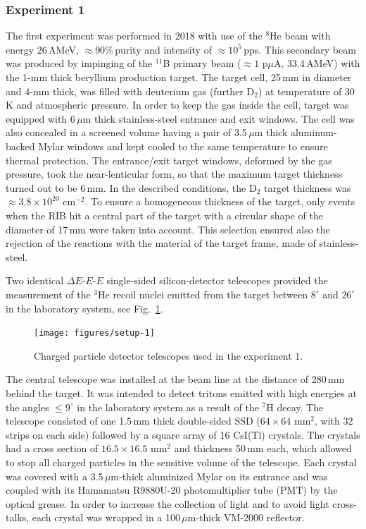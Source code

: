 \subsubsection{Experiment 1}

The first experiment was performed in 2018 with use of the $^{8}$He beam with energy 26\,AMeV, $\approx90\%$\,purity and intensity of $\approx10^{5}$\,pps.
This secondary beam was produced by impinging of the $^{11}$B primary beam ($\approx 1$ p$\mu$A, 33.4\,AMeV) with  the 1-mm thick beryllium production target.
The target cell, 25\,mm in diameter and 4-mm thick, was filled with deuterium gas (further D$_{2}$) at temperature of 30\,K and atmospheric pressure. 
In order to keep the gas inside the cell, target was equipped with 6\,$\mu$m thick stainless-steel entrance and exit windows.
The cell was also concealed in a screened volume having a pair of 3.5\,$\mu$m thick aluminum-backed Mylar windows and kept cooled to the same temperature to ensure thermal protection.
The entrance/exit target windows, deformed by the gas pressure, took the near-lenticular form, so that the maximum target thickness turned out to be 6\,mm.
In the described conditions, the D$_{2}$ target thickness was $\approx 3.8 \times 10 ^{20}$ cm$^{-2}$.
To ensure a homogeneous thickness of the target, only events when the RIB hit a central part of the target with a circular shape of the diameter of 17\,mm were taken into account.
This selection ensured also the rejection of the reactions with the material of the target frame, made of stainless-steel.

Two identical $\Delta E$-$E$-$E$ single-sided silicon-detector telescopes provided the measurement of the $^3$He recoil nuclei emitted from the target between $8^{\circ}$ and $26^{\circ}$ in the laboratory system, see Fig.\ \ref{fig:setup-1}.

\begin{figure}
	\begin{center}
		\texttt{[image: figures/setup-1]}
	\end{center}
	\caption{Charged particle detector telescopes used in the experiment 1.}
	\label{fig:setup-1}
\end{figure}

The central telescope was installed at the beam line at the distance of 280\,mm behind the target.
It was intended to detect tritons emitted with high energies at the angles $\leq9^{\circ}$ in the laboratory system as a result of the $^7$H decay.
The telescope consisted of one 1.5\,mm thick double-sided SSD ($64 \times 64$ mm$^2$, with 32 strips on each side) followed by a square array of 16 CsI(Tl) crystals.
The crystals had a cross section of $16.5\times16.5$ mm$^2$ and thickness 50\,mm each, which allowed to stop all charged particles in the sensitive volume of the telescope.
Each crystal was covered with a 3.5\,$\mu$m-thick aluminized Mylar on its entrance and was coupled with its Hamamatsu R9880U-20 photomultiplier tube (PMT) by the optical grease.
In order to increase the collection of light and to avoid light cross-talks, each crystal was wrapped in a 100\,$\mu$m-thick VM-2000 reflector.
